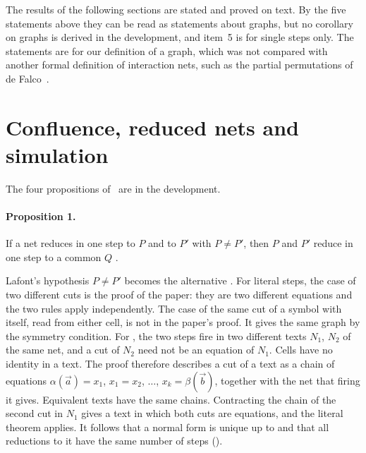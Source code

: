 \documentclass[11pt,a4paper]{article}
\newcommand{\lean}[1]{%
  \VerbatimInput[frame=single,rulecolor=\color{codeframe},framesep=1.6mm,breaklines=true,
    breakanywhere=false,breaksymbolleft={},samepage=true,fontsize=\fontsize{7.4}{9.0}\selectfont]{snip/#1.lean}}
\newcommand{\Equiv}{\cod{Equiv}}
\newcommand{\pp}[1]{\cite[#1]{lafont1997}}
\begin{document}
The results of the following sections are stated and proved on text. By the five statements
above they can be read as statements about graphs, but no corollary on graphs is derived in the
development, and item~5 is for single steps only. The statements are for our definition of a
graph, which was not compared with another formal definition of interaction nets, such as the
partial permutations of de Falco~\cite{defalco2010}.

\section{Confluence, reduced nets and simulation}
\label{sec:theory}

The four propositions of~\cite[Section~1]{lafont1997} are in the development.

\paragraph{Proposition 1.}
If a net reduces in one step to $P$ and to $P'$ with $P \neq P'$, then $P$ and $P'$ reduce in
one step to a common $Q$ \pp{p.~73}.

\lean{prop1}

Lafont's hypothesis $P \neq P'$ becomes the alternative . For literal steps,
the case of two different cuts is the proof of the paper: they are two different equations and
the two rules apply independently. The case of the same cut of a symbol with itself, read from
either cell, is not in the paper's proof. It gives the same graph by the symmetry condition.
For , the two steps fire in two different texts $N_1$, $N_2$ of the same net, and a
cut of $N_2$ need not be an equation of $N_1$. Cells have no identity in a text. The proof
therefore describes a cut of a text as a chain of equations $\alpha(\vec a) = x_1$, $x_1 =
x_2$, $\ldots$, $x_k = \beta(\vec b)$, together with the net that firing it gives. Equivalent
texts have the same chains. Contracting the chain of the second cut in $N_1$ gives a text in
which both cuts are equations, and the literal theorem applies. It follows that a normal form is unique up to
\Equiv{} and that all reductions to it have the same number of steps
().
\end{document}
